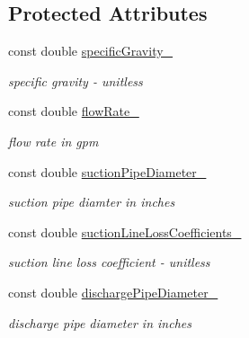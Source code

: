\subsection*{Protected Attributes}
\begin{DoxyCompactItemize}
\item 
\mbox{\label{class_head_tool_base_a19ee231d55b1bee31d48876e43da14de}} 
const double \hyperlink{class_head_tool_base_a19ee231d55b1bee31d48876e43da14de}{specific\+Gravity\+\_\+}
\begin{DoxyCompactList}\small\item\em specific gravity -\/ unitless \end{DoxyCompactList}\item 
\mbox{\label{class_head_tool_base_a5a52095ea100a279d48dfd97032d4658}} 
const double \hyperlink{class_head_tool_base_a5a52095ea100a279d48dfd97032d4658}{flow\+Rate\+\_\+}
\begin{DoxyCompactList}\small\item\em flow rate in gpm \end{DoxyCompactList}\item 
\mbox{\label{class_head_tool_base_a96fe7fbe12c4c0ac2cc6a0f681ffc170}} 
const double \hyperlink{class_head_tool_base_a96fe7fbe12c4c0ac2cc6a0f681ffc170}{suction\+Pipe\+Diameter\+\_\+}
\begin{DoxyCompactList}\small\item\em suction pipe diamter in inches \end{DoxyCompactList}\item 
\mbox{\label{class_head_tool_base_a8cfbb2d33b36164e5be8f5ee785e62ea}} 
const double \hyperlink{class_head_tool_base_a8cfbb2d33b36164e5be8f5ee785e62ea}{suction\+Line\+Loss\+Coefficients\+\_\+}
\begin{DoxyCompactList}\small\item\em suction line loss coefficient -\/ unitless \end{DoxyCompactList}\item 
\mbox{\label{class_head_tool_base_a34385a58538b690611f6f4fd11623c7f}} 
const double \hyperlink{class_head_tool_base_a34385a58538b690611f6f4fd11623c7f}{discharge\+Pipe\+Diameter\+\_\+}
\begin{DoxyCompactList}\small\item\em discharge pipe diameter in inches \end{DoxyCompactList}\item 

\end{DoxyCompactItemize}
